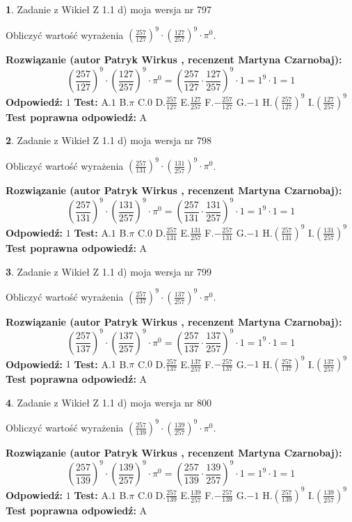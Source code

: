 \documentclass[12pt, a4paper]{article}
\theoremstyle{definition} %
\newtheorem{zad}{}
\newcommand{\zadStart}[1]{\begin{zad}#1\newline}
\newcommand{\zadStop}{\end{zad}}
\newcommand{\rozwStart}[2]{\noindent \textbf{Rozwiązanie (autor #1 , recenzent #2): }\newline}
\newcommand{\rozwStop}{\newline}
\newcommand{\odpStart}{\noindent \textbf{Odpowiedź:}\newline}
\newcommand{\odpStop}{\newline}
\newcommand{\testStart}{\noindent \textbf{Test:}\newline}
\newcommand{\testStop}{\newline}
\newcommand{\kluczStart}{\noindent \textbf{Test poprawna odpowiedź:}\newline}
\newcommand{\kluczStop}{\newline}
\begin{document}
\zadStart{Zadanie z Wikieł Z 1.1 d) moja wersja nr 797}

Obliczyć wartość wyrażenia $(\frac{257}{127})^{9} \cdot (\frac{127}{257})^{9} \cdot \pi^{0}$.
\zadStop
\rozwStart{Patryk Wirkus}{Martyna Czarnobaj}
$$(\frac{257}{127})^{9} \cdot (\frac{127}{257})^{9} \cdot \pi^{0} = (\frac{257}{127} \cdot \frac{127}{257})^{9} \cdot 1 = 1^{9} \cdot 1 = 1$$
\rozwStop
\odpStart
$1$
\odpStop
\testStart
A.$1$ B.$\pi$ C.$0$ D.$\frac{257}{127}$ E.$\frac{127}{257}$
F.$-\frac{257}{127}$ G.$-1$
H.$(\frac{257}{127})^{9}$
I.$(\frac{127}{257})^{9}$
\testStop
\kluczStart
A
\kluczStop



\zadStart{Zadanie z Wikieł Z 1.1 d) moja wersja nr 798}

Obliczyć wartość wyrażenia $(\frac{257}{131})^{9} \cdot (\frac{131}{257})^{9} \cdot \pi^{0}$.
\zadStop
\rozwStart{Patryk Wirkus}{Martyna Czarnobaj}
$$(\frac{257}{131})^{9} \cdot (\frac{131}{257})^{9} \cdot \pi^{0} = (\frac{257}{131} \cdot \frac{131}{257})^{9} \cdot 1 = 1^{9} \cdot 1 = 1$$
\rozwStop
\odpStart
$1$
\odpStop
\testStart
A.$1$ B.$\pi$ C.$0$ D.$\frac{257}{131}$ E.$\frac{131}{257}$
F.$-\frac{257}{131}$ G.$-1$
H.$(\frac{257}{131})^{9}$
I.$(\frac{131}{257})^{9}$
\testStop
\kluczStart
A
\kluczStop



\zadStart{Zadanie z Wikieł Z 1.1 d) moja wersja nr 799}

Obliczyć wartość wyrażenia $(\frac{257}{137})^{9} \cdot (\frac{137}{257})^{9} \cdot \pi^{0}$.
\zadStop
\rozwStart{Patryk Wirkus}{Martyna Czarnobaj}
$$(\frac{257}{137})^{9} \cdot (\frac{137}{257})^{9} \cdot \pi^{0} = (\frac{257}{137} \cdot \frac{137}{257})^{9} \cdot 1 = 1^{9} \cdot 1 = 1$$
\rozwStop
\odpStart
$1$
\odpStop
\testStart
A.$1$ B.$\pi$ C.$0$ D.$\frac{257}{137}$ E.$\frac{137}{257}$
F.$-\frac{257}{137}$ G.$-1$
H.$(\frac{257}{137})^{9}$
I.$(\frac{137}{257})^{9}$
\testStop
\kluczStart
A
\kluczStop



\zadStart{Zadanie z Wikieł Z 1.1 d) moja wersja nr 800}

Obliczyć wartość wyrażenia $(\frac{257}{139})^{9} \cdot (\frac{139}{257})^{9} \cdot \pi^{0}$.
\zadStop
\rozwStart{Patryk Wirkus}{Martyna Czarnobaj}
$$(\frac{257}{139})^{9} \cdot (\frac{139}{257})^{9} \cdot \pi^{0} = (\frac{257}{139} \cdot \frac{139}{257})^{9} \cdot 1 = 1^{9} \cdot 1 = 1$$
\rozwStop
\odpStart
$1$
\odpStop
\testStart
A.$1$ B.$\pi$ C.$0$ D.$\frac{257}{139}$ E.$\frac{139}{257}$
F.$-\frac{257}{139}$ G.$-1$
H.$(\frac{257}{139})^{9}$
I.$(\frac{139}{257})^{9}$
\testStop
\kluczStart
A
\kluczStop
\end{document}
